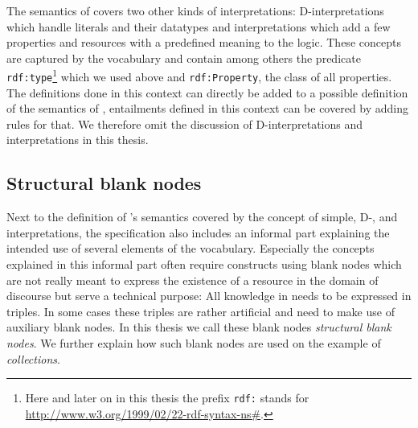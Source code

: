 %  
The semantics of  \rdf covers two other kinds of interpretations: D-interpretations which handle literals and their datatypes and \rdf interpretations 
which add a few properties and resources with a predefined meaning to the logic. These concepts are captured by the \rdf vocabulary and contain among others the predicate 
\texttt{rdf:type}\footnote{Here and later on in this thesis the prefix \texttt{rdf:} stands for  \url{http://www.w3.org/1999/02/22-rdf-syntax-ns\#}. } which we used above and 
\texttt{rdf:Property}, the class of all properties. 
% 
The definitions done in this context can directly be added to a 
possible definition of the semantics of \nthree, entailments defined in this context can be covered by adding rules for that. 
%
We therefore omit the discussion of D-interpretations and \rdf interpretations in this thesis.

\subsection{Structural blank nodes}
Next to the definition of \rdf's semantics covered by the concept of simple, D-, and \rdf interpretations, 
the \rdf specification also includes an informal part explaining the intended use of several elements of the \rdf vocabulary. 
Especially %
the concepts explained in this informal part often require constructs using blank nodes which are not really 
meant to express the existence of a resource in the domain of discourse but 
serve a technical purpose: All knowledge in \rdf needs to be expressed in triples. In some cases these triples are rather artificial and 
need to make use of auxiliary blank nodes. In this thesis we call these blank nodes \emph{structural blank nodes}. 
We further explain how such blank nodes are used on the example of \emph{\rdf collections}. 

